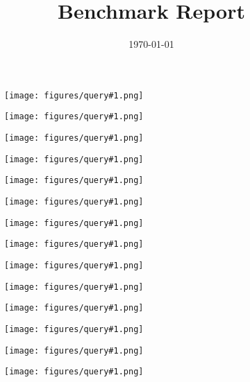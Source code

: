 \documentclass[a4paper,12pt]{report}
\title{Benchmark Report}
\date{\today}
\newcommand{\showq}[1]{
    \begin{figure}
	\centering
	\texttt{[image: figures/query\#1.png]}
	\label{bench:query#1}
    \end{figure}
}
\begin{document}

\maketitle

\showq{0}

\showq{1}

\showq{2}

\showq{3}

\showq{4}

\showq{5}

\showq{6}

\showq{7}

\showq{8}

\showq{9}

\showq{10}

\showq{11}

\showq{12}

\showq{13}
\end{document}
